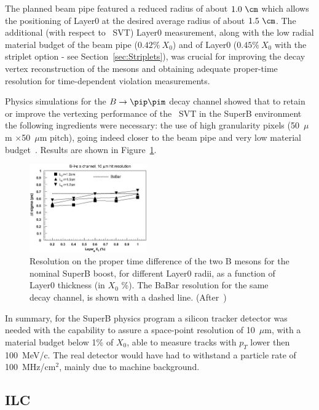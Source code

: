 The planned beam pipe featured a reduced radius of about $1.0~\cm$  which allows the positioning of 
Layer0 at
the desired average radius of about $1.5~\cm$. The additional  (with respect to \babar\ SVT) 
 Layer0 measurement,
along with the low radial material budget of the beam pipe ($0.42\%~X_0$)
and of Layer0 ($0.45\%~X_0$ with the striplet option - see Section~\ref{sec:Striplets}),
was crucial for improving the decay vertex reconstruction of the \B mesons and
 obtaining adequate proper-time resolution for time-dependent \CP violation measurements.

Physics simulations for the $B\to\pip\pim$ decay channel showed that to retain or improve the vertexing performance of the \babar\ SVT in the SuperB environment the following ingredients were necessary: the use of high granularity pixels (50~$\mu$m $\times$50~$\mu$m pitch), going indeed closer to the beam pipe and very low material budget~\cite{RIZZO2010585}. Results are shown in 
Figure~\ref{fig:bpipi}. 

\begin{figure}
\centering
\includegraphics[width=0.45\textwidth]{bpipi}
\caption{\label{fig:bpipi} Resolution on the proper time difference of the two B mesons for the nominal SuperB boost, for different Layer0 radii, as a function of Layer0 thickness (in $X_0$ \%). The BaBar resolution for the same decay channel, is shown with a dashed line. (After~\cite{RIZZO2010585})}
\end{figure}

In summary, for the SuperB physics program a silicon tracker detector was needed with the 
capability to assure a space-point resolution of 10~$\mu$m, with a material budget below 
1\% of $X_0$, able to measure tracks with $p_T$ lower then 100~MeV/c. The real detector 
would have had to withstand a particle rate of 100~MHz/cm$^2$, mainly due to machine 
background.

\subsection{ILC}

